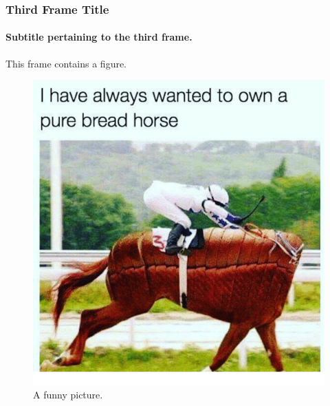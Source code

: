 \documentclass[aspectratio=169]{beamer}
\numberwithin{equation}{section}
\begin{document}
\begin{frame}
\frametitle{Third Frame Title}
\framesubtitle{Subtitle pertaining to the third frame.}

This frame contains a figure.

\begin{figure}[H]
\centering
{}
    \includegraphics[height=0.5\textheight]{../img/funny.png}
\caption{A funny picture.}
\end{figure}

\end{frame}
\end{document}
